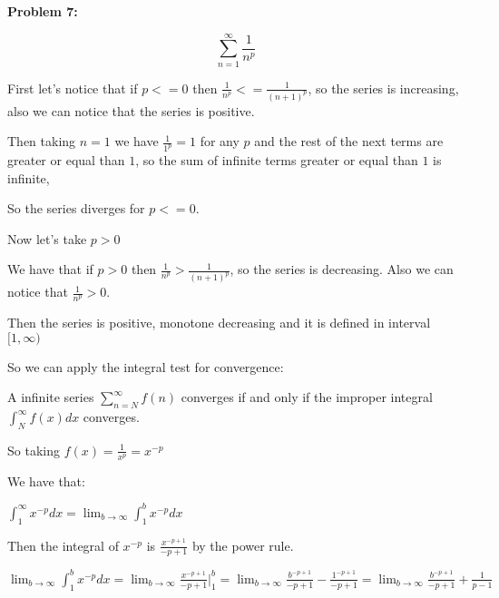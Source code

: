 \textbf{Problem 7:}

\singlespacing


\begin{equation}
    \sum_{n=1}^{\infty} \frac{1}{n^p}
\end{equation}

\singlespacing

First let's notice that if $p<=0$ then $\frac{1}{n^p} <= \frac{1}{(n+1)^p}$,
so the series is increasing, also we can notice that the series is positive.

\singlespacing

Then taking $n=1$ we have $\frac{1}{1^p} = 1$ for any $p$ and the rest of the next terms are
greater or equal than $1$, so the sum of infinite terms greater or equal than $1$ is infinite,

\singlespacing

So the series diverges for $p<=0$.

\singlespacing
\singlespacing
\singlespacing

Now let's take $p>0$

\singlespacing

We have that if $p>0$ then $\frac{1}{n^p} > \frac{1}{(n+1)^p}$, so the series is decreasing. Also we can notice that $\frac{1}{n^p} > 0$.

\singlespacing

Then the series is positive, monotone decreasing and it is defined in interval $[1, \infty)$

\singlespacing

So we can apply the integral test for convergence:

\singlespacing

A infinite series $\sum_{n=N}^{\infty} f(n)$ converges if and only if the improper integral $\int_{N}^{\infty} f(x) dx$ converges.

\singlespacing

So taking $f(x) = \frac{1}{x^p} = x^{-p}$

\singlespacing

We have that:

\singlespacing

$\int_{1}^{\infty} x^{-p} dx = \lim_{b \to \infty} \int_{1}^{b} x^{-p} dx$

\singlespacing

Then the integral of $x^{-p}$ is $\frac{x^{-p+1}}{-p+1}$ by the power rule.

\singlespacing

$\lim_{b \to \infty} \int_{1}^{b} x^{-p} dx = \lim_{b \to \infty} \frac{x^{-p+1}}{-p+1} \Big|_{1}^{b} = \lim_{b \to \infty} \frac{b^{-p+1}}{-p+1} - \frac{1^{-p+1}}{-p+1} = \lim_{b \to \infty} \frac{b^{-p+1}}{-p+1} + \frac{1}{p-1}$

